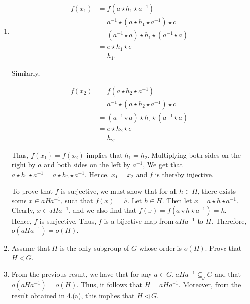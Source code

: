 \documentclass[12pt]{article}
\makeatletter
\theoremstyle{definition}
\theoremstyle{remark}
\renewenvironment{proof}[1][\proofname]{\par
  \pushQED{\qed}%
  \normalfont \topsep6\p@\@plus6\p@\relax
  \list{}{\leftmargin=0mm
          \rightmargin=4mm
          \settowidth{\itemindent}{\itshape#1}%
          \labelwidth=\itemindent
          \parsep=0pt \listparindent=\parindent 
  }
  \item[\hskip\labelsep
        \itshape
    #1\@addpunct{.}]\ignorespaces
}{%
  \popQED\endlist\@endpefalse
}
\let\oldproofname=\proofname
\renewcommand{\proofname}{\bf{\textit{\oldproofname}}}
\makeatother
\begin{document}
\begin{enumerate}[leftmargin=*]
\begin{enumerate}[label=(\alph*)]
\begin{proof}
                    \begin{equation*}
                        \begin{split}
                            f(x_1)&=f(a\star h_1\star a^{-1}) \\
                            &=a^{-1}\star(a\star h_1\star a^{-1})\star a \\
                            &= (a^{-1}\star a)\star h_1\star (a^{-1}\star a) \\
                            &= e\star h_1\star e \\
                            &= h_1.
                        \end{split}
                    \end{equation*}
                    
                    Similarly, 
                    
                    \begin{equation*}
                        \begin{split}
                            f(x_2) &=f(a\star h_2\star a^{-1}) \\
                            &=a^{-1}\star(a\star h_2\star a^{-1})\star a \\
                            &= (a^{-1}\star a)\star h_2\star (a^{-1}\star a) \\
                            &= e\star h_2\star e \\
                            &= h_2.
                        \end{split}
                    \end{equation*}
                    
                    Thus, $f(x_1)=f(x_2)$ implies that $h_1=h_2$. Multiplying both sides on the right by $a$ and both sides on the left by $a^{-1}$, We get that $a\star h_1\star a^{-1}=a\star h_2\star a^{-1}$. Hence, $x_1=x_2$ and $f$ is thereby injective.\par\hspace{4mm} To prove that $f$ is surjective, we must show that for all $h\in H$, there exists some $x\in aHa^{-1}$, such that $f(x)=h$. Let $h\in H$. Then let $x=a\star h\star a^{-1}$. Clearly, $x\in aHa^{-1}$, and we also find that $f(x)=f(a\star h\star a^{-1})=h$. Hence, $f$ is surjective. Thus, $f$ is a bijective map from $aHa^{-1}$ to $H$. Therefore, $o(aHa^{-1})=o(H)$.
                \end{proof}
            \item Assume that $H$ is the only subgroup of $G$ whose order is $o(H)$. Prove that $H\triangleleft G$.
                \begin{proof}
                    From the previous result, we have that for any $a\in G$, $aHa^{-1}\subseteq_g G$ and that $o(aHa^{-1})=o(H)$. Thus, it follows that $H=aHa^{-1}$. Moreover, from the result obtained in 4.(a), this implies that $H\triangleleft G$.
                \end{proof}
        \end{enumerate}
        

\end{enumerate}
\end{document}
